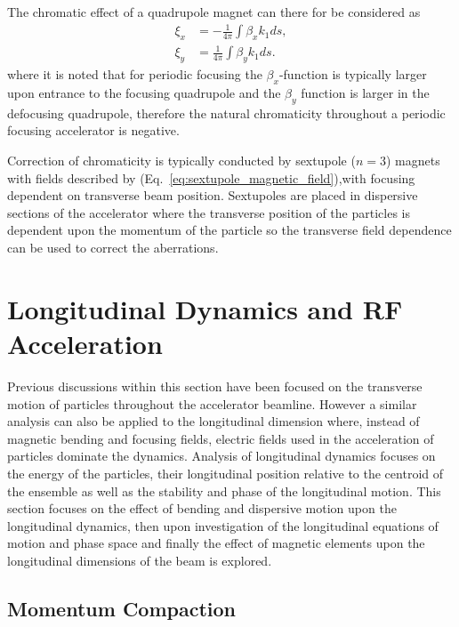 \documentclass[../main.tex]{subfiles}
\begin{document}
The chromatic effect of a quadrupole magnet can there for be considered as
\begin{align}
\xi_{x} &= -\frac{1}{4\pi}\int\beta_{x}k_{1}ds, \\
\xi_{y} &= \frac{1}{4\pi}\int\beta_{y}k_{1}ds.
\label{eq:quadrupole_chromaticity}
\end{align}
where it is noted that for periodic focusing the $\beta_{x}$-function is typically larger upon entrance to the focusing quadrupole and the $\beta_{y}$ function is larger in the defocusing quadrupole, therefore the natural chromaticity throughout a periodic focusing accelerator is negative. 

Correction of chromaticity is typically conducted by sextupole ($n=3$) magnets with fields described by (Eq.~\ref{eq:sextupole_magnetic_field}),with focusing dependent on transverse beam position. Sextupoles are placed in dispersive sections of the accelerator where the transverse position of the particles is dependent upon the momentum of the particle so the transverse field dependence can be used to correct the aberrations. 

\section{Longitudinal Dynamics and RF Acceleration}

Previous discussions within this section have been focused on the transverse motion of particles throughout the accelerator beamline. However a similar analysis can also be applied to the longitudinal dimension where, instead of magnetic bending and focusing fields, electric fields used in the acceleration of particles dominate the dynamics. Analysis of longitudinal dynamics focuses on the energy of the particles, their longitudinal position relative to the centroid of the ensemble as well as the stability and phase of the longitudinal motion. This section focuses on the effect of bending and dispersive motion upon the longitudinal dynamics, then upon investigation of the longitudinal equations of motion and phase space and finally the effect of magnetic elements upon the longitudinal dimensions of the beam is explored.

\subsection{Momentum Compaction}
\label{sec:momentum_compaction}
\end{document}
